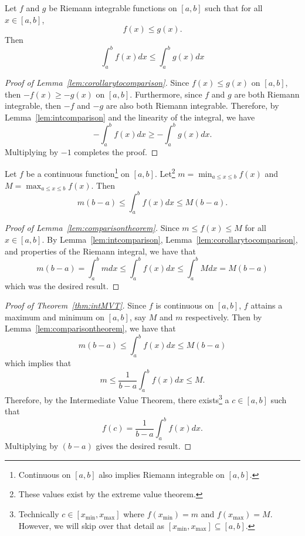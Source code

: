 \documentclass[12pt]{article}
\begin{document}
\begin{enumerate}[leftmargin=2em]
\begin{enumerate}[leftmargin=!]
        \begin{lemma}\label{lem:corollarytocomparison}
            Let $f$ and $g$ be Riemann integrable functions on $[a,b]$ such that for all $x\in [a,b]$,
            \[f(x)\leq g(x).\]
            Then
            \[\int_{a}^{b} f(x)dx\leq \int_{a}^{b} g(x)dx\]
        \end{lemma}
        \begin{proof}[Proof of Lemma~\ref{lem:corollarytocomparison}]
            Since $f(x)\leq g(x)$ on $[a,b]$, then $-f(x)\geq -g(x)$ on $[a,b]$. Furthermore, since $f$ and $g$ are both Riemann integrable, then $-f$ and $-g$ are also both Riemann integrable. Therefore, by Lemma~\ref{lem:intcomparison} and the linearity of the integral, we have
            \[-\int_{a}^{b}f(x)dx \geq -\int_{a}^{b}g(x)dx.\]
            Multiplying by $-1$ completes the proof.
        \end{proof}
        \newpage
        \begin{lemma}\label{lem:comparisontheorem}
            Let $f$ be a continuous function\footnote{Continuous on $[a,b]$ also implies Riemann integrable on $[a,b]$.} on $[a,b]$. Let\footnote{These values exist by the extreme value theorem.} $m=\min_{a\leq x\leq b} f(x)$ and $M=\max_{a\leq x\leq b}f(x)$. 
            Then
            \[m(b-a)\leq \int_{a}^{b} f(x)dx \leq M(b-a).\]
        \end{lemma}
        \begin{proof}[Proof of Lemma~\ref{lem:comparisontheorem}]
            Since $m\leq f(x)\leq M$ for all $x\in [a,b]$. By Lemma~\ref{lem:intcomparison}, Lemma~\ref{lem:corollarytocomparison}, and properties of the Riemann integral, we have that
            \[m(b-a)=\int_{a}^{b} m dx \leq  \int_{a}^{b} f(x) dx \leq \int_{a}^{b} M dx = M(b-a) \]
            which was the desired result.
        \end{proof}
        \begin{proof}[Proof of Theorem~\ref{thm:intMVT}]
            Since $f$ is continuous on $[a,b]$, $f$ attains a maximum and minimum on $[a,b]$, say $M$ and $m$ respectively. Then by Lemma~\ref{lem:comparisontheorem}, we have that
            \[m(b-a)\leq \int_{a}^{b} f(x) dx\leq M(b-a)\]
            which implies that
            \[m\leq \frac{1}{b-a} \int_{a}^{b} f(x) dx \leq M.\]
            Therefore, by the Intermediate Value Theorem, there exists\footnote{Technically $c\in [x_{\min},x_{\max}]$ where $f(x_{\min})=m$ and $f(x_{\max})= M$. However, we will skip over that detail as $[x_{\min},x_{\max}]\subseteq [a,b]$.} a $c\in [a,b]$ such that
            \[f(c)=\frac{1}{b-a}\int_{a}^{b}f(x)dx.\]
            Multiplying by $(b-a)$ gives the desired result.
        \end{proof}
    \end{enumerate}
    

\end{enumerate}
\end{document}
